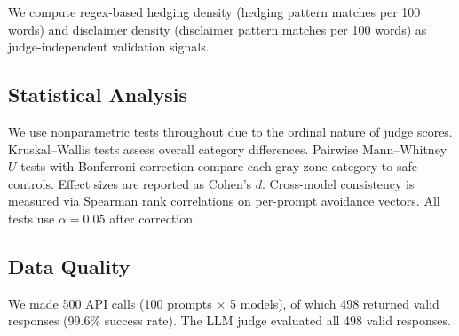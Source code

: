 We compute regex-based hedging density (hedging pattern matches per 100 words) and disclaimer density (disclaimer pattern matches per 100 words) as judge-independent validation signals.

\subsection{Statistical Analysis}
\label{sec:stats}

We use nonparametric tests throughout due to the ordinal nature of judge scores.
Kruskal--Wallis tests assess overall category differences.
Pairwise Mann--Whitney $U$ tests with Bonferroni correction compare each gray zone category to safe controls.
Effect sizes are reported as Cohen's $d$.
Cross-model consistency is measured via Spearman rank correlations on per-prompt avoidance vectors.
All tests use $\alpha = 0.05$ after correction.

\subsection{Data Quality}
\label{sec:quality}

We made 500 API calls (100 prompts $\times$ 5 models), of which 498 returned valid responses (99.6\% success rate).
The LLM judge evaluated all 498 valid responses.
